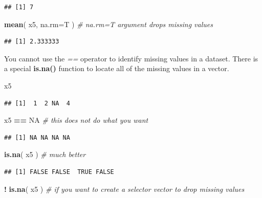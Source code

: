 \documentclass[]{book}
\newenvironment{Shaded}{\begin{snugshade}}{\end{snugshade}}
\newcommand{\CommentTok}[1]{\textcolor[rgb]{0.56,0.35,0.01}{\textit{#1}}}
\newcommand{\DataTypeTok}[1]{\textcolor[rgb]{0.13,0.29,0.53}{#1}}
\newcommand{\KeywordTok}[1]{\textcolor[rgb]{0.13,0.29,0.53}{\textbf{#1}}}
\newcommand{\NormalTok}[1]{#1}
\newcommand{\OperatorTok}[1]{\textcolor[rgb]{0.81,0.36,0.00}{\textbf{#1}}}
\newcommand{\OtherTok}[1]{\textcolor[rgb]{0.56,0.35,0.01}{#1}}
\newcommand{\StringTok}[1]{\textcolor[rgb]{0.31,0.60,0.02}{#1}}
\theoremstyle{definition}
\theoremstyle{definition}
\theoremstyle{definition}
\theoremstyle{remark}
\begin{document}
\begin{verbatim}
## [1] 7
\end{verbatim}

\begin{Shaded}
\begin{Highlighting}[]
\KeywordTok{mean}\NormalTok{( x5, }\DataTypeTok{na.rm=}\NormalTok{T )  }\CommentTok{# na.rm=T argument drops missing values}
\end{Highlighting}
\end{Shaded}

\begin{verbatim}
## [1] 2.333333
\end{verbatim}

You cannot use the \emph{==} operator to identify missing values in a
dataset. There is a special \textbf{is.na()} function to locate all of
the missing values in a vector.

\begin{Shaded}
\begin{Highlighting}[]
\NormalTok{x5}
\end{Highlighting}
\end{Shaded}

\begin{verbatim}
## [1]  1  2 NA  4
\end{verbatim}

\begin{Shaded}
\begin{Highlighting}[]
\NormalTok{x5 }\OperatorTok{==}\StringTok{ }\OtherTok{NA}    \CommentTok{# this does not do what you want}
\end{Highlighting}
\end{Shaded}

\begin{verbatim}
## [1] NA NA NA NA
\end{verbatim}

\begin{Shaded}
\begin{Highlighting}[]
\KeywordTok{is.na}\NormalTok{( x5 )    }\CommentTok{# much better}
\end{Highlighting}
\end{Shaded}

\begin{verbatim}
## [1] FALSE FALSE  TRUE FALSE
\end{verbatim}

\begin{Shaded}
\begin{Highlighting}[]
\OperatorTok{!}\StringTok{ }\KeywordTok{is.na}\NormalTok{( x5 )  }\CommentTok{# if you want to create a selector vector to drop missing values }
\end{Highlighting}
\end{Shaded}
\end{document}
